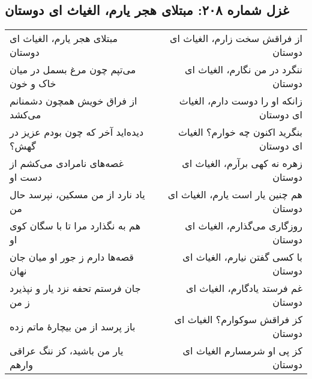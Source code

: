 \begin{center}
\section*{غزل شماره ۲۰۸: مبتلای هجر یارم، الغیاث ای دوستان}
\label{sec:208}
\begin{longtable}{l p{0.5cm} r}
مبتلای هجر یارم، الغیاث ای دوستان
&&
از فراقش سخت زارم، الغیاث ای دوستان
\\
می‌تپم چون مرغ بسمل در میان خاک و خون
&&
ننگرد در من نگارم، الغیاث ای دوستان
\\
از فراق خویش همچون دشمنانم می‌کشد
&&
زانکه او را دوست دارم، الغیاث ای دوستان
\\
دیده‌اید آخر که چون بودم عزیز در گهش؟
&&
بنگرید اکنون چه خوارم؟ الغیاث ای دوستان
\\
غصه‌های نامرادی می‌کشم از دست او
&&
زهره نه کهی برآرم، الغیاث ای دوستان
\\
یاد نارد از من مسکین، نپرسد حال من
&&
هم چنین یار است یارم، الغیاث ای دوستان
\\
هم به نگذارد مرا تا با سگان کوی او
&&
روزگاری می‌گذارم، الغیاث ای دوستان
\\
قصه‌ها دارم ز جور او میان جان نهان
&&
با کسی گفتن نیارم، الغیاث ای دوستان
\\
جان فرستم تحفه نزد یار و نپذیرد ز من
&&
غم فرستد یادگارم، الغیاث ای دوستان
\\
باز پرسد از من بیچارهٔ ماتم زده
&&
کز فراقش سوکوارم؟ الغیاث ای دوستان
\\
یار من باشید، کز ننگ عراقی وارهم
&&
کز پی او شرمسارم الغیاث ای دوستان
\\
\end{longtable}
\end{center}
